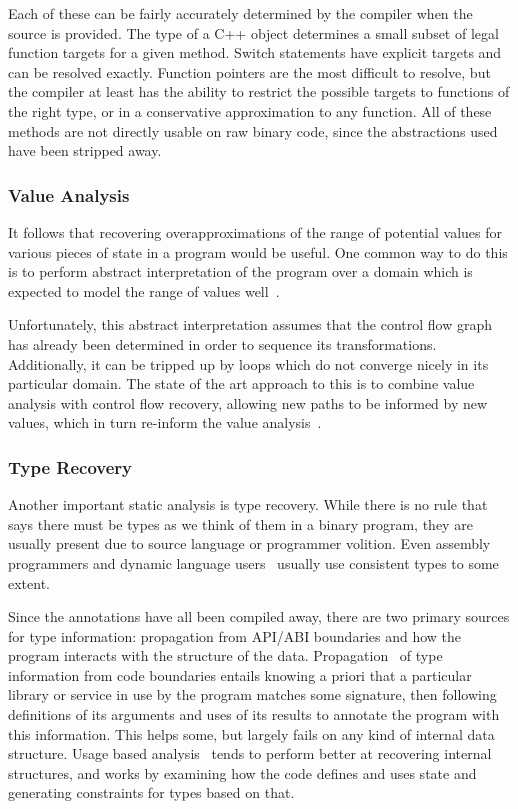Each of these can be fairly accurately determined by the compiler when the source is provided.
The type of a C++ object determines a small subset of legal function targets for a given method.
Switch statements have explicit targets and can be resolved exactly.
Function pointers are the most difficult to resolve, but the compiler at least has the ability to restrict the possible targets to functions of the right type, or in a conservative approximation to any function.
All of these methods are not directly usable on raw binary code, since the abstractions used have been stripped away.

\subsubsection{Value Analysis}
\label{sec:valanal}
It follows that recovering overapproximations of the range of potential values for various pieces of state in a program would be useful.
One common way to do this is to perform abstract interpretation of the program over a domain which is expected to model the range of values well~\cite{vsa,wrappedintervals,wrappedintervals2}.

Unfortunately, this abstract interpretation assumes that the control flow graph has already been determined in order to sequence its transformations.
Additionally, it can be tripped up by loops which do not converge nicely in its particular domain.
The state of the art approach to this is to combine value analysis with control flow recovery, allowing new paths to be informed by new values, which in turn re-inform the value analysis~\cite{jakstab}.

\subsubsection{Type Recovery}
Another important static analysis is type recovery.
While there is no rule that says there must be types as we think of them in a binary program, they are usually present due to source language or programmer volition.
Even assembly programmers and dynamic language users~\cite{jsinfer} usually use consistent types to some extent.

Since the annotations have all been compiled away, there are two primary sources for type information: propagation from API/ABI boundaries and how the program interacts with the structure of the data.
Propagation~\cite{howard} of type information from code boundaries entails knowing a priori that a particular library or service in use by the program matches some signature, then following definitions of its arguments and uses of its results to annotate the program with this information.
This helps some, but largely fails on any kind of internal data structure.
Usage based analysis~\cite{tie,bitr} tends to perform better at recovering internal structures, and works by examining how the code defines and uses state and generating constraints for types based on that.

